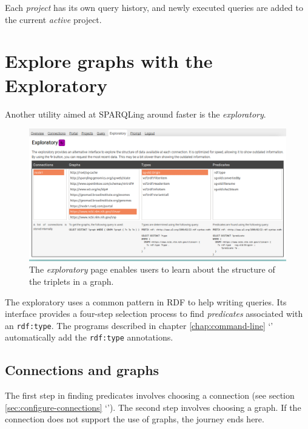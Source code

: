   Each \emph{project} has its own query history, and newly executed queries are
  added to the current \emph{active} project.

\section{Explore graphs with the Exploratory}

  Another utility aimed at SPARQLing around faster is the \emph{exploratory}.

  \begin{figure}[h]
    \begin{center}
      \includegraphics[width=1.0\textwidth]{figures/web-exploratory.png}
    \end{center}
    \caption{The \emph{exploratory} page enables users to learn about the
      structure of the triplets in a graph.}
    \label{fig:web-exploratory}
  \end{figure}

  The exploratory uses a common pattern in RDF to help writing queries.  Its
  interface provides a four-step selection process to find \emph{predicates}
  associated with an \texttt{rdf:type}.  The programs described in chapter
  \ref{chap:command-line} {\color{LinkGray}`'}
  automatically add the \texttt{rdf:type} annotations.

\subsection{Connections and graphs}

  The first step in finding predicates involves choosing a connection
  (see section \ref{sec:configure-connections} {\color{LinkGray}%
    `'}).  The second step involves
  choosing a graph.  If the connection does not support the use of graphs,
  the journey ends here.

